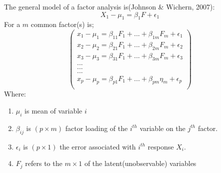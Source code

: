 \documentclass[12]{article}
\begin{document}
\noindent The general model of a factor analysis is(Johnson \& Wichern, 2007):
	\begin{equation}
	X_1- \mu_1=\beta_1 F + \epsilon_1
\end{equation}
\noindent For a $m$ common factor(s) is;
	\[
	\left(
	\begin{matrix}
		x_1 - \mu_1= \beta_{11}F_1 +...+\beta_{1m}F_m +\epsilon_1 \\
		x_2 - \mu_2= \beta_{21}F_1 +...+\beta_{2m}F_m +\epsilon_2 \\
		x_3 - \mu_3 = \beta_{31}F_1+...+\beta_{3m}F_m +\epsilon_3 \\
		.                  .              .      \\
		.                  .               .     \\
		.                  .              .     \\
		x_p - \mu_p =\beta_{p1}F_1+...+\beta_{pm}\eta_m +\epsilon_p \\                
		
	\end{matrix}
	\right)
	\]
\noindent Where:
\begin{enumerate}[label=\roman*]
\item $\mu_i$ is mean of variable $i$\\
\item $\beta_{ij}$ is $(p\times m)$ factor loading of the $i^{th}$ variable on the $j^{th}$ factor. \\
\item $\epsilon_i$ is $(p \times 1)$ the error associated with $i^{th}$ response $X_i$.\\
\item $F_j$ refers to the $m \times1$ of the latent(unobservable) variables\\

\end{enumerate}
\end{document}
